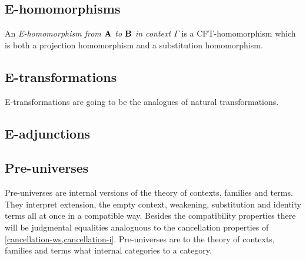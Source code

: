 \subsection{E-homomorphisms}
\begin{defn}
An \emph{E-homomorphism from $\mathbf{A}$ to $\mathbf{B}$ in context $\Gamma$}
is a CFT-homomorphism which is both a projection homomorphism and a
substitution homomorphism.
\end{defn}

\subsection{E-transformations}
E-transformations are going to be the analogues of natural transformations.

\subsection{E-adjunctions}

\subsection{Pre-universes}
Pre-universes are internal versions of the theory of contexts, families and
terms. They interpret extension, the empty context, weakening, substitution
and identity terms all at once in a compatible way. Besides the compatibility
properties there will be judgmental equalities analoguous to the cancellation
properties of \autoref{cancellation-ws,cancellation-i}. Pre-universes are to
the theory of contexts, families and terms what internal categories to a
category.
